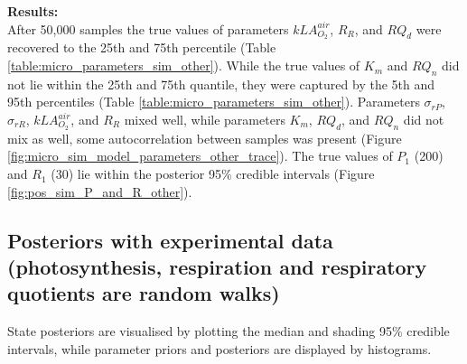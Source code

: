 \documentclass{ruthesis}
\begin{document}
\textbf{Results:}\\
After 50,000 samples the true values of parameters $kLA_{O_2}^{air}$, $R_R$, and $RQ_d$ were recovered to the 25th and 75th percentile (Table \ref{table:micro_parameters_sim_other}). While the true values of $K_m$ and $RQ_n$ did not lie within the 25th and 75th quantile, they were captured by the 5th and 95th percentiles (Table \ref{table:micro_parameters_sim_other}). 
Parameters $\sigma_{rP}$, $\sigma_{rR}$, $kLA_{O_2}^{air}$, and $R_R$ mixed well, while parameters $K_m$, $RQ_d$, and $RQ_n$ did not mix as well, some autocorrelation between samples was present (Figure \ref{fig:micro_sim_model_parameters_other_trace}). The true values of $P_1$ (200) and $R_1$ (30) lie within the posterior 95\% credible intervals
(Figure \ref{fig:pos_sim_P_and_R_other}).

\FloatBarrier
\subsection{Posteriors with experimental data (photosynthesis, respiration and respiratory quotients are random walks)}

State posteriors are visualised by plotting the median and shading 95\% credible intervals, while parameter priors and posteriors are displayed by histograms.
\end{document}
